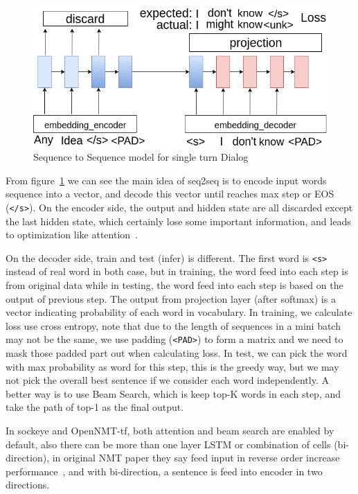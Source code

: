 \documentclass{article}
\begin{document}
\begin{figure}[h]
    \centering
    \includegraphics[width=\columnwidth]{seq2seq-simple}
    \caption{Sequence to Sequence model for single turn Dialog}
    \label{fig:seq2seq}
\end{figure}

From figure~\ref{fig:seq2seq} we can see the main idea of seq2seq is to encode input words sequence into a vector,
and decode this vector until reaches max step or EOS (\verb+</s>+).
On the encoder side, the output and hidden state are all discarded except the last hidden state,
which certainly lose some important information, and leads to optimization like attention~\cite{luong2015effective}.

On the decoder side, train and test (infer) is different.
The first word is \verb+<s>+ instead of real word in both case, but in training, the word feed into each step is from
original data while in testing, the word feed into each step is based on the output of previous step.
The output from projection layer (after softmax) is a vector indicating probability of each word in vocabulary.
In training, we calculate loss use cross entropy, note that due to the length of sequences in a mini batch may not be the same,
we use padding (\verb+<PAD>+) to form a matrix and we need to mask those padded part out when calculating loss.
In test, we can pick the word with max probability as word for this step, this is the greedy way,
but we may not pick the overall best sentence if we consider each word independently.
A better way is to use Beam Search, which is keep top-K words in each step, and take the path of top-1 as the final output.

In sockeye and OpenNMT-tf, both attention and beam search are enabled by default, also there can be more than one layer LSTM
or combination of cells (bi-direction), in original NMT paper they say feed input in reverse order increase performance~\cite{sutskever2014sequence},
and with bi-direction, a sentence is feed into encoder in two directions.
\end{document}
